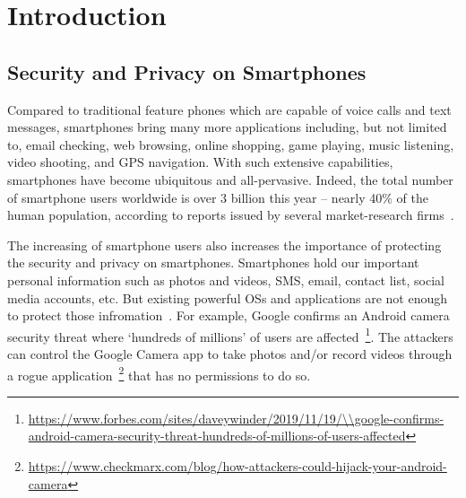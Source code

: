 \chapter{Introduction}

%	
%	
%	

\section{Security and Privacy on Smartphones}
Compared to traditional feature phones which are capable of voice calls and text messages,
%
smartphones bring many more applications including, but not limited to, email checking, web browsing, online shopping, game playing, music listening, video shooting, and GPS navigation.
%
%
%
%
With such extensive capabilities, smartphones have become ubiquitous and all-pervasive.
%
Indeed, the total number of smartphone users worldwide is over 3 billion this year -- nearly 40\% of the human population, according to reports issued by several market-research firms~\cite{report2018newzoo,report2019forrester}. 


The increasing of smartphone users also increases the importance of protecting the security and privacy on smartphones. 
%
Smartphones hold our important personal information such as photos and videos, SMS, email, contact list, social media accounts, etc. But existing powerful OSs and applications are not enough to protect those infromation~\cite{ali2019security}. For example, Google confirms an Android camera security threat where `hundreds of millions' of users are affected~\footnote{\url{https://www.forbes.com/sites/daveywinder/2019/11/19/\\google-confirms-android-camera-security-threat-hundreds-of-millions-of-users-affected}}. The attackers can control the Google Camera app to take photos and/or record videos through a rogue application~\footnote{\url{https://www.checkmarx.com/blog/how-attackers-could-hijack-your-android-camera}} that has no permissions to do so. 


